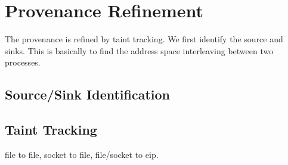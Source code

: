 \section{Provenance Refinement}
\label{s:provRef}

The provenance is refined by taint tracking.
We first identify the source and sinks. This is basically to find the address space interleaving between two processes.

\subsection{Source/Sink Identification}
\label{s:srcsink}

\subsection{Taint Tracking}
\label{s:taint}

 file to file, socket to file, file/socket to eip. 

